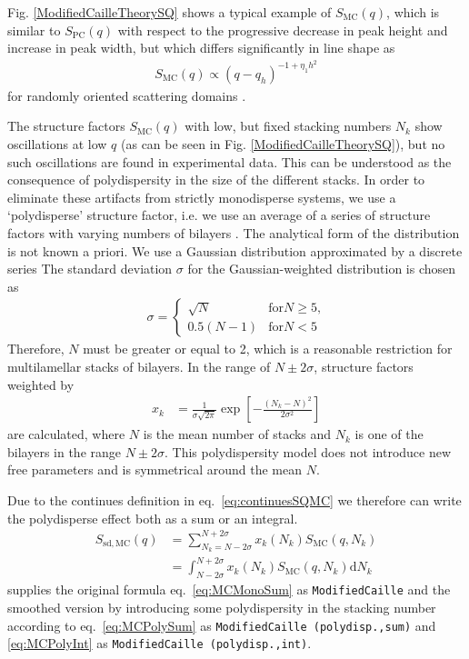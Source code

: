 Fig. \ref{ModifiedCailleTheorySQ} shows a typical example of
$S_{\mathrm{MC}}(q)$, which is similar to $S_\text{PC}(q)$ with
respect to the progressive decrease in peak height and increase in
peak width, but which differs significantly in line shape as
\begin{align}
S_{\mathrm{MC}}(q) \propto (q-q_h)^{-1+\eta_1 h^2}
\end{align}
for randomly oriented scattering domains \cite{Roux1988,Zhang1994}.


The structure factors $S_{\mathrm{MC}}(q)$ with low, but fixed
stacking numbers $N_k$ show oscillations at low $q$ (as can be seen in
Fig. \ref{ModifiedCailleTheorySQ}), but no such oscillations are
found in experimental data. This can be understood as the
consequence of polydispersity in the size of the different stacks.
In order to eliminate these artifacts from strictly monodisperse
systems, we use a `polydisperse' structure factor, i.e. we use an
average of a series of structure factors with varying numbers of
bilayers \cite{Fruhwirth2004}. The analytical form of the
distribution is not known a priori. We use a Gaussian distribution
approximated by a discrete series The standard deviation $\sigma$
for the Gaussian-weighted distribution is chosen as
\begin{align}
\sigma =
\begin{cases}
\sqrt{N} & \text{for} N\geq 5 \text{,} \\
0.5(N-1) & \text{for} N< 5
\end{cases}
\end{align}
Therefore, $N$ must be greater or equal to 2, which is a
reasonable restriction for multilamellar stacks of bilayers. In
the range of $N \pm 2\sigma$, structure factors weighted by
\begin{align}
x_k & = \frac{1}{\sigma\sqrt{2\pi}} \exp\left[
-\frac{(N_k-N)^2}{2\sigma^2}\right]
\end{align}
are calculated, where $N$ is the mean number of stacks and $N_k$
is one of the  bilayers in the range $N\pm 2\sigma$. This
polydispersity model does not introduce new free parameters and is
symmetrical around the mean $N$.

Due to the continues definition in eq.\ \ref{eq:continuesSQMC} we therefore can write the polydisperse effect both as a sum or an integral.
\begin{align}
  S_\mathrm{sd,MC}(q) & = \sum_{N_k=N-2\sigma}^{N+2\sigma} x_k(N_k) S_\mathrm{MC}(q,N_k) \label{eq:MCPolySum} \\
                      & = \int_{N-2\sigma}^{N+2\sigma} x_k(N_k) S_\mathrm{MC}(q,N_k) \mathrm{d}N_k \label{eq:MCPolyInt}
\end{align}
\SASfit supplies the original formula eq.\ \ref{eq:MCMonoSum} as  \texttt{ModifiedCaille} and the smoothed version by introducing some polydispersity in the stacking number according to eq.\ \ref{eq:MCPolySum} as \texttt{ModifiedCaille (polydisp.,sum)} and \ref{eq:MCPolyInt} as \texttt{ModifiedCaille (polydisp.,int)}.

